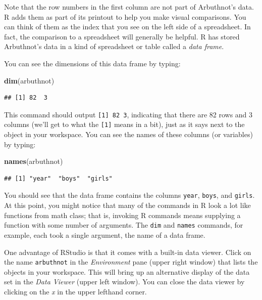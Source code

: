 \documentclass[]{book}
\newenvironment{Shaded}{\begin{snugshade}}{\end{snugshade}}
\newcommand{\KeywordTok}[1]{\textcolor[rgb]{0.13,0.29,0.53}{\textbf{#1}}}
\newcommand{\NormalTok}[1]{#1}
\theoremstyle{definition}
\theoremstyle{definition}
\theoremstyle{definition}
\theoremstyle{remark}
\begin{document}
Note that the row numbers in the first column are not part of
Arbuthnot's data. R adds them as part of its printout to help you make
visual comparisons. You can think of them as the index that you see on
the left side of a spreadsheet. In fact, the comparison to a spreadsheet
will generally be helpful. R has stored Arbuthnot's data in a kind of
spreadsheet or table called a \emph{data frame}.

You can see the dimensions of this data frame by typing:

\begin{Shaded}
\begin{Highlighting}[]
\KeywordTok{dim}\NormalTok{(arbuthnot)}
\end{Highlighting}
\end{Shaded}

\begin{verbatim}
## [1] 82  3
\end{verbatim}

This command should output \texttt{{[}1{]}\ 82\ 3}, indicating that
there are 82 rows and 3 columns (we'll get to what the \texttt{{[}1{]}}
means in a bit), just as it says next to the object in your workspace.
You can see the names of these columns (or variables) by typing:

\begin{Shaded}
\begin{Highlighting}[]
\KeywordTok{names}\NormalTok{(arbuthnot)}
\end{Highlighting}
\end{Shaded}

\begin{verbatim}
## [1] "year"  "boys"  "girls"
\end{verbatim}

You should see that the data frame contains the columns \texttt{year},
\texttt{boys}, and \texttt{girls}. At this point, you might notice that
many of the commands in R look a lot like functions from math class;
that is, invoking R commands means supplying a function with some number
of arguments. The \texttt{dim} and \texttt{names} commands, for example,
each took a single argument, the name of a data frame.

One advantage of RStudio is that it comes with a built-in data viewer.
Click on the name \texttt{arbuthnot} in the \emph{Environment} pane
(upper right window) that lists the objects in your workspace. This will
bring up an alternative display of the data set in the \emph{Data
Viewer} (upper left window). You can close the data viewer by clicking
on the \emph{x} in the upper lefthand corner.
\end{document}

